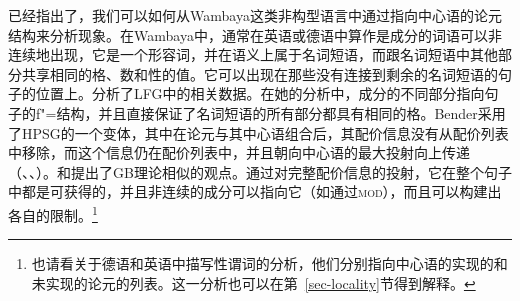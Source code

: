 \citet{Bender2008a}\label{Seite-Bender-Wambaya}已经指出了，我们可以如何从Wambaya这类非构型语言中通过指向中心语的论元结构来分析现象。在Wambaya中，通常在英语或德语中算作是成分的词语可以非连续地出现，它是一个形容词，并在语义上属于名词短语，而跟名词短语中其他部分共享相同的格、数和性的值。它可以出现在那些没有连接到剩余的名词短语的句子的位置上。\citet{Nordlinger98a-u}分析了LFG\indexlfg 中的相关数据。在她的分析中，成分的不同部分指向句子的f"=结构，并且直接保证了名词短语的所有部分都具有相同的格。Bender采用了HPSG的一个变体，其中在论元与其中心语组合后，其配价信息没有从配价列表中移除，而这个信息仍在配价列表中，并且朝向中心语的最大投射向上传递（\citealp{Meurers99b}、\citealp{Prze99}、\citealp[Section~17.4]{MuellerLehrbuch1}）。\citet[]{Higginbotham85a}和\citet{Winkler97a}提出了GB理论相似的观点。通过对完整配价信息的投射，它在整个句子中都是可获得的，并且非连续的成分可以指向它（如通过\textsc{mod}），而且可以构建出各自的限制。\footnote{
也请看关于德语和英语中描写性谓词的分析，他们分别指向中心语的实现的和未实现的论元的列表。这一分析也可以在第~\ref{sec-locality}节得到解释。
}  
